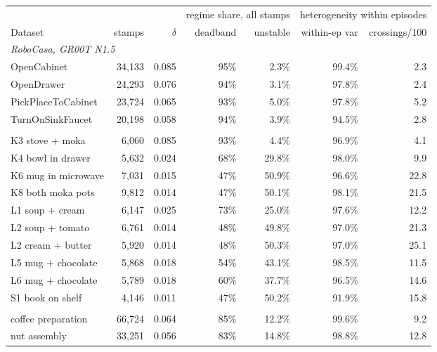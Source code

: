 \begin{table}[t]
\centering
\scriptsize
\setlength{\tabcolsep}{4pt}
\begin{tabular}{lrrrrrr}
\toprule
& & & \multicolumn{2}{c}{regime share, all stamps} & \multicolumn{2}{c}{heterogeneity within episodes} \\
\cmidrule(lr){4-5} \cmidrule(lr){6-7}
Dataset & stamps & $\delta$ & deadband & unstable & within-ep var & crossings/100 \\
\midrule
\multicolumn{7}{l}{\textit{RoboCasa, GR00T N1.5}} \\
\quad OpenCabinet & 34,133 & 0.085 & 95\% & 2.3\% & 99.4\% & 2.3 \\
\quad OpenDrawer & 24,293 & 0.076 & 94\% & 3.1\% & 97.8\% & 2.4 \\
\quad PickPlaceToCabinet & 23,724 & 0.065 & 93\% & 5.0\% & 97.8\% & 5.2 \\
\quad TurnOnSinkFaucet & 20,198 & 0.058 & 94\% & 3.9\% & 94.5\% & 2.8 \\
\addlinespace[2pt]
\multicolumn{7}{l}{\textit{LIBERO-10, diffusion policy}} \\
\quad K3 stove + moka & 6,060 & 0.085 & 93\% & 4.4\% & 96.9\% & 4.1 \\
\quad K4 bowl in drawer & 5,632 & 0.024 & 68\% & 29.8\% & 98.0\% & 9.9 \\
\quad K6 mug in microwave & 7,031 & 0.015 & 47\% & 50.9\% & 96.6\% & 22.8 \\
\quad K8 both moka pots & 9,812 & 0.014 & 47\% & 50.1\% & 98.1\% & 21.5 \\
\quad L1 soup + cream & 6,147 & 0.025 & 73\% & 25.0\% & 97.6\% & 12.2 \\
\quad L2 soup + tomato & 6,761 & 0.014 & 48\% & 49.8\% & 97.0\% & 21.3 \\
\quad L2 cream + butter & 5,920 & 0.014 & 48\% & 50.3\% & 97.0\% & 25.1 \\
\quad L5 mug + chocolate & 5,868 & 0.018 & 54\% & 43.1\% & 98.5\% & 11.5 \\
\quad L6 mug + chocolate & 5,789 & 0.018 & 60\% & 37.7\% & 96.5\% & 14.6 \\
\quad S1 book on shelf & 4,146 & 0.011 & 47\% & 50.2\% & 91.9\% & 15.8 \\
\addlinespace[2pt]
\multicolumn{7}{l}{\textit{MimicGen, diffusion policy}} \\
\quad coffee preparation & 66,724 & 0.064 & 85\% & 12.2\% & 99.6\% & 9.2 \\
\quad nut assembly & 33,251 & 0.056 & 83\% & 14.8\% & 98.8\% & 12.8 \\

\end{tabular}
\end{table}
